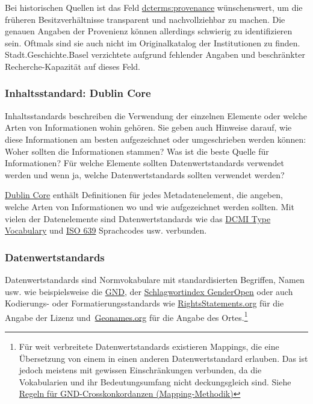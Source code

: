 \documentclass[
  nswissgerman,
  letterpaper,
  DIV=11,
  numbers=noendperiod]{scrartcl}
\begin{document}
Bei historischen Quellen ist das Feld
\href{https://www.dublincore.org/specifications/dublin-core/dcmi-terms/terms/provenance/}{dcterms:provenance}
wünschenswert, um die früheren Besitzverhältnisse transparent und
nachvollziehbar zu machen. Die genauen Angaben der Provenienz können
allerdings schwierig zu identifizieren sein. Oftmals sind sie auch nicht
im Originalkatalog der Institutionen zu finden. Stadt.Geschichte.Basel
verzichtete aufgrund fehlender Angaben und beschränkter
Recherche-Kapazität auf dieses Feld.

\subsubsection{Inhaltsstandard: Dublin
Core}\label{inhaltsstandard-dublin-core}

Inhaltsstandards beschreiben die Verwendung der einzelnen Elemente oder
welche Arten von Informationen wohin gehören. Sie geben auch Hinweise
darauf, wie diese Informationen am besten aufgezeichnet oder
umgeschrieben werden können: Woher sollten die Informationen stammen?
Was ist die beste Quelle für Informationen? Für welche Elemente sollten
Datenwertstandards verwendet werden und wenn ja, welche
Datenwertstandards sollten verwendet werden?

\href{https://www.dublincore.org}{Dublin Core} enthält Definitionen für
jedes Metadatenelement, die angeben, welche Arten von Informationen wo
und wie aufgezeichnet werden sollten. Mit vielen der Datenelemente sind
Datenwertstandards wie das
\href{https://www.dublincore.org/specifications/dublin-core/dcmi-type-vocabulary/}{DCMI
Type Vocabulary} und
\href{https://www.iso.org/iso-639-language-codes.html}{ISO 639}
Sprachcodes usw. verbunden.

\subsubsection{Datenwertstandards}\label{datenwertstandards}

Datenwertstandards sind Normvokabulare mit standardisierten Begriffen,
Namen usw. wie beispielsweise die \href{https://gnd.network/}{GND}, der
\href{https://opengenderplatform.de/schlagwortindex}{Schlagwortindex
GenderOpen} oder auch Kodierungs- oder Formatierungsstandards wie
\href{http://rightsstatements.org}{RightsStatements.org} für die Angabe
der Lizenz und~\href{https://www.geonames.org/}{Geonames.org} für die
Angabe des Ortes.\footnote{Für weit verbreitete Datenwertstandards
  existieren Mappings, die eine Übersetzung von einem in einen anderen
  Datenwertstandard erlauben. Das ist jedoch meistens mit gewissen
  Einschränkungen verbunden, da die Vokabularien und ihr
  Bedeutungsumfang nicht deckungsgleich sind. Siehe
  \href{https://wiki.dnb.de/pages/viewpage.action?pageId=263851113}{Regeln
  für GND-Crosskonkordanzen (Mapping-Methodik)}}
\end{document}
